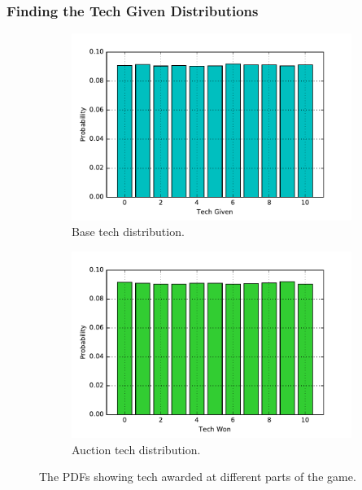 \documentclass[11pt, twoside]{article}
\begin{document}
\subsubsection*{Finding the Tech Given Distributions}

\begin{figure}[b!]
	\centering
	\begin{subfigure}[b]{0.49\textwidth}
		\includegraphics[width=\textwidth]{base_tech.pdf}
		\caption{Base tech distribution.}
	\end{subfigure}
	\begin{subfigure}[b]{0.49\textwidth}
		\includegraphics[width=\textwidth]{auction_tech.pdf}
		\caption{Auction tech distribution.}
	\end{subfigure}
	\caption{The PDFs showing tech awarded at different parts of the game.}
	\label{Base&TechDistributions}
\end{figure}
\end{document}
